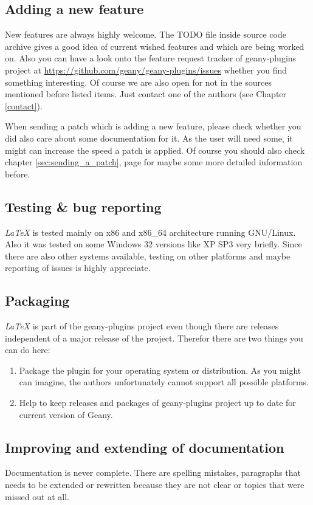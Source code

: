 \documentclass[%
paper=a4,%
fontsize=11pt,%
twoside=false,%
DIV18,%
headsepline,%
plainheadsepline,%
footsepline,%
plainfootsepline,%
bibliography=totoc,%
listof=totoc,%
BCOR10mm,%
parskip=half,%
openany,%
]{scrreprt}
\begin{document}
\subsection{Adding a new feature}
New features are always highly welcome. The TODO file inside source
code archive gives a good idea of current wished features and which
are being worked on. Also you can have a look onto the feature request
tracker of geany-plugins project at
\url{https://github.com/geany/geany-plugins/issues} whether you find
something interesting. Of course we are also open for not in the
sources mentioned before listed items. Just contact one of the authors
(see Chapter \ref{contact}).

When sending a patch which is adding a new feature, please check
whether you did also care about some documentation for it. As the
user will need some, it might can increase the speed a patch is
applied. Of course you should also check chapter \ref{sec:sending_a_patch},
page \pageref{sec:sending_a_patch} for maybe some more detailed
information before.

\subsection{Testing \& bug reporting} \textit{LaTeX} is tested mainly
on x86 and x86\_64 architecture running GNU/Linux. Also it was
tested on some Windows 32 versions like XP SP3 very briefly. Since
there are also other systems available, testing on other platforms
and maybe reporting of issues is highly appreciate.

\subsection{Packaging}
\textit{LaTeX} is part of the geany-plugins project even though there
are releases independent of a major release of the project. Therefor
there are two things you can do here:
\begin{enumerate}
    \item Package the plugin for your operating system or
    distribution. As you might can imagine, the authors unfortunately
    cannot support all possible platforms.
    \item Help to keep releases and packages of geany-plugins project
    up to date for current version of Geany.
\end{enumerate}


\subsection{Improving and extending of documentation}
Documentation is never complete. There are spelling mistakes,
paragraphs that needs to be extended or rewritten because they are not
clear or topics that were missed out at all.
\end{document}
